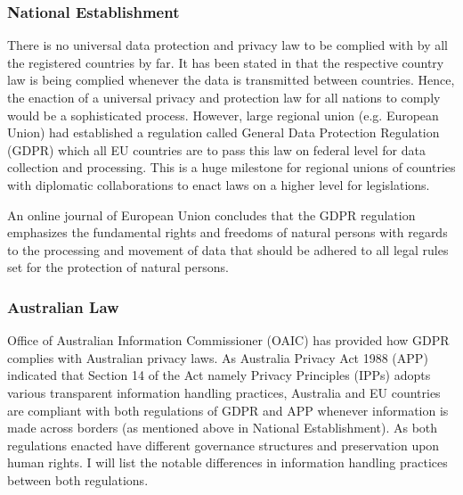     \subsubsection{National Establishment}
      \par There is no universal data protection and privacy law to be complied with by all the registered countries by far. It has been stated in \textcite{Ian4} that the respective country law is being complied whenever the data is transmitted between countries. Hence, the enaction of a universal privacy and protection law for all nations to comply would be a sophisticated process. However, large regional union (e.g. European Union) had established a regulation called General Data Protection Regulation (GDPR) which all EU countries are to pass this law on federal level for data collection and processing. This is a huge milestone for regional unions of countries with diplomatic collaborations to enact laws on a higher level for legislations.
      \par An online journal of European Union \parencite{Ian5} concludes that the GDPR regulation emphasizes the fundamental rights and freedoms of natural persons with regards to the processing and movement of data that should be adhered to all legal rules set for the protection of natural persons.

    \subsubsection{Australian Law}
      \par Office of Australian Information Commissioner (OAIC) \parencite{Ian6} has provided how GDPR complies with Australian privacy laws. As Australia Privacy Act 1988 (APP) indicated that Section 14 of the Act namely Privacy Principles (IPPs) adopts various transparent information handling practices, Australia and EU countries are compliant with both regulations of GDPR and APP whenever information is made across borders (as mentioned above in National Establishment). As both regulations enacted have different governance structures and preservation upon human rights. I will list the notable differences in information handling practices between both regulations.

